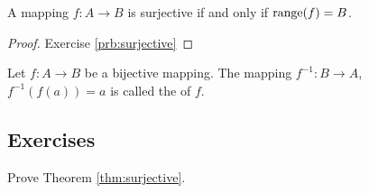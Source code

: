 \begin{theorem}\label{thm:surjective}
A mapping $ f:A\to B $ is surjective if and only if $ \operatorname{range}(f)=B $.
\end{theorem}
\begin{proof}
Exercise \ref{prb:surjective}\noqed
\end{proof}

\begin{definition}
Let $ f:A\to B $ be a bijective mapping. The mapping $ f^{-1}:B\to A $, $ f^{-1}(f(a))=a $ is called the  of $ f $.
\end{definition}

\subsection*{Exercises}

\begin{problem}\label{prb:surjective}
Prove Theorem \ref{thm:surjective}.
\end{problem}